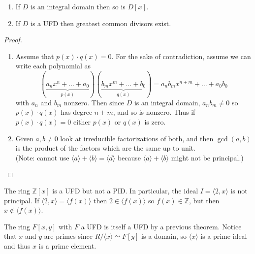 \documentclass{article}
\newenvironment{example}[1][Example.]{
  \begin{trivlist} \item[\hskip \labelsep {\bfseries #1}]
}{\end{trivlist}}
\newenvironment{theorem}[1][Theorem.]{
  \begin{trivlist} \item[\hskip \labelsep {\bfseries #1}]
}{\end{trivlist}}
\newcommand{\ang}[1]{\langle #1 \rangle}
\begin{document}
\begin{theorem}[Lemmas.] $ $
  \begin{enumerate}
    \item If $D$ is an integral domain then so is $D[x]$.
    \item If $D$ is a UFD then greatest common divisors exist.
  \end{enumerate}
\end{theorem}
\begin{proof} $ $
  \begin{enumerate}
    \item Assume that $p(x)\cdot q(x) = 0$. For the sake of contradiction,
    assume we can write each polynomial as
    \[
      (\underbrace{a_n x^n + \hdots + a_0}_{p(x)})
      (\underbrace{b_mx^m + \hdots + b_0}_{q(x)}) =
      a_n b_mx^{n + m} + \hdots + a_0b_0
    \] with $a_n$ and $b_m$ nonzero.
    Then since $D$ is an integral domain, $a_n b_m \neq 0$ so $p(x) \cdot q(x)$
    has degree $n + m$, and so is nonzero. Thus if $p(x) \cdot q(x) = 0$
    either $p(x)$ or $q(x)$ is zero.
    \item Given $a, b \neq 0$ look at irreducible factorizations of both, and
    then $\gcd(a, b)$ is the product of the factors which are the same up to
    unit.\\
    (Note: cannot use $\ang a + \ang b = \ang d$ because $\ang a + \ang b$
    might not be principal.)
  \end{enumerate}
\end{proof}
\begin{example}
  The ring $\mathbb Z[x]$ is a UFD but not a PID. In particular, the ideal
  $I = \ang{2, x}$ is not principal. If $\ang{2, x} = \ang{f(x)}$ then
  $2 \in \ang{f(x)}$ so $f(x) \in \mathbb Z$, but then $x \not\in \ang{f(x)}$.
\end{example}
\begin{example}
  The ring $F[x, y]$ with $F$ a UFD is itself a UFD by a previous theorem.
  Notice that $x$ and $y$ are primes since $R/\ang x \simeq F[y]$ is a domain,
  so $\ang{x}$ is a prime ideal and thus $x$ is a prime element.
\end{example}
\end{document}
